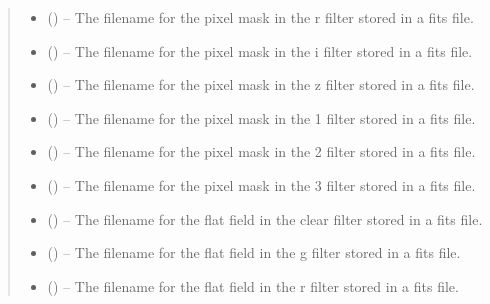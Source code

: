 \documentclass[letterpaper,11pt,english]{sphinxmanual}
\begin{document}
\begin{savenotes}
\begin{fulllineitems}
\begin{savenotes}
\begin{fulllineitems}
\begin{quote}
\begin{description}
\begin{itemize}
\item {} 
\sphinxAtStartPar
{} () – The filename for the pixel mask in the r filter stored in a
fits file.

\item {} 
\sphinxAtStartPar
{} () – The filename for the pixel mask in the i filter stored in a
fits file.

\item {} 
\sphinxAtStartPar
{} () – The filename for the pixel mask in the z filter stored in a
fits file.

\item {} 
\sphinxAtStartPar
{} () – The filename for the pixel mask in the 1 filter stored in a
fits file.

\item {} 
\sphinxAtStartPar
{} () – The filename for the pixel mask in the 2 filter stored in a
fits file.

\item {} 
\sphinxAtStartPar
{} () – The filename for the pixel mask in the 3 filter stored in a
fits file.

\item {} 
\sphinxAtStartPar
{} () – The filename for the flat field in the clear filter stored in a
fits file.

\item {} 
\sphinxAtStartPar
{} () – The filename for the flat field in the g filter stored in a
fits file.

\item {} 
\sphinxAtStartPar
{} () – The filename for the flat field in the r filter stored in a
fits file.


\end{itemize}
\end{description}
\end{quote}
\end{fulllineitems}
\end{savenotes}
\end{fulllineitems}
\end{savenotes}
\end{document}
